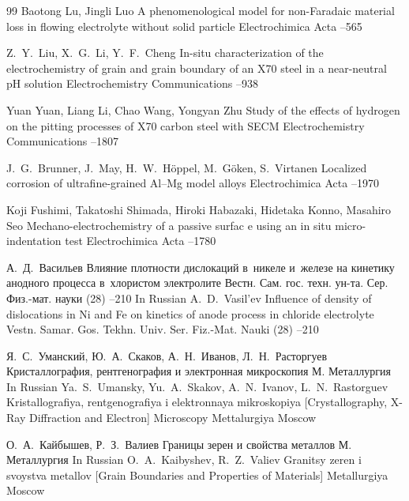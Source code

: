\begin{thebibliography}{99}
\by Baotong Lu, Jingli Luo
\paper A phenomenological model for non-Faradaic material loss in flowing electrolyte without solid particle 
\jour Electrochimica Acta
--565

\by Z.~Y.~Liu, X.~G.~Li, Y.~F.~Cheng
\paper In-situ characterization of the electrochemistry of grain and grain boundary of an X70 steel in a near-neutral pH solution
\jour Electrochemistry Communications
--938

\by Yuan Yuan, Liang Li, Chao Wang, Yongyan Zhu
\paper Study of the effects of hydrogen on the pitting processes of X70 carbon steel with SECM 
\jour Electrochemistry Communications
--1807

\by J.~G.~Brunner, J.~May, H.~W.~H\"{o}ppel, M.~G\"{o}ken,  S.~Virtanen
\paper Localized corrosion of ultrafine-grained Al--Mg model alloys
\jour Electrochimica Acta
--1970

\by Koji Fushimi, Takatoshi Shimada, Hiroki Habazaki, Hidetaka Konno, Masahiro Seo
\paper Mechano-electrochemistry of a passive surfac e using an in situ  micro-indentation test 
\jour Electrochimica Acta
--1780

\by А.~Д.~Васильев
\paper Влияние плотности дислокаций в~никеле и~железе на кинетику анодного процесса в~хлористом электролите
\jour Вестн. Сам. гос. техн. ун-та. Сер. Физ.-мат. науки
(28)
--210
\misctransl
\lang In Russian
\by A.~D.~Vasil'ev
\paper Influence of density of dislocations in Ni and Fe on kinetics of anode process in chloride electrolyte
\jour Vestn. Samar. Gos. Tekhn. Univ. Ser. Fiz.-Mat. Nauki
(28)
--210

\by  Я.~С.~Уманский, Ю.~А.~Скаков, А.~Н.~Иванов, Л.~Н.~Расторгуев
\book Кристаллография, рентгенография и электронная микроскопия
\publaddr М.
\publ Металлургия
\misctransl
\lang In Russian
\by Ya.~S.~Umansky, Yu.~A.~Skakov, A.~N.~Ivanov, L.~N.~Rastorguev 
\book Kristallografiya, rentgenografiya i elektronnaya mikroskopiya \rm [Crystallography, X-Ray Diffraction and Electron] Microscopy
\publ Mettalurgiya
\publaddr Moscow

\by О.~А.~Кайбышев, Р.~З.~Валиев
\book Границы зерен и свойства металлов
\publaddr М.
\publ Металлургия
\misctransl
\lang In Russian
\by O.~A.~Kaibyshev, R.~Z.~Valiev
\book Granitsy zeren i svoystva metallov  \rm [Grain Boundaries and Properties of Materials]
\publ Metallurgiya
\publaddr Moscow

\end{thebibliography}



